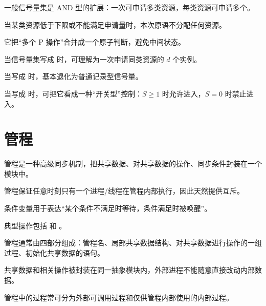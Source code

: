 \begin{points}
  \item 一般信号量集是 AND 型的扩展：一次可申请多类资源，每类资源可申请多个。
  \item 当某类资源低于下限或不能满足申请量时，本次原语不分配任何资源。
  \item 它把“多个 P 操作”合并成一个原子判断，避免中间状态。
\end{points}


\begin{points}
  \item 当信号量集写成  时，可理解为一次申请同类资源的 $d$ 个实例。
  \item 当写成  时，基本退化为普通记录型信号量。
  \item 当写成  时，可把它看成一种“开关型”控制：$S\ge 1$ 时允许进入，$S=0$ 时禁止进入。
\end{points}


\section{管程}
\begin{points}
  \item 管程是一种高级同步机制，把共享数据、对共享数据的操作、同步条件封装在一个模块中。
  \item 管程保证任意时刻只有一个进程/线程在管程内部执行，因此天然提供互斥。
  \item 条件变量用于表达“某个条件不满足时等待，条件满足时被唤醒”。
  \item 典型操作包括  和 。
\end{points}


\begin{points}
  \item 管程通常由四部分组成：管程名、局部共享数据结构、对共享数据进行操作的一组过程、初始化共享数据的语句。
  \item 共享数据和相关操作被封装在同一抽象模块内，外部进程不能随意直接改动内部数据。
  \item 管程中的过程常可分为外部可调用过程和仅供管程内部使用的内部过程。
\end{points}


